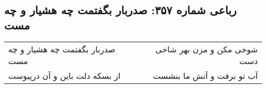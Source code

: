 \begin{center}
\section*{رباعی شماره ۳۵۷: صدربار بگفتمت چه هشیار و چه مست}
\label{sec:0357}
\begin{longtable}{l p{0.5cm} r}
صدربار بگفتمت چه هشیار و چه مست
&&
شوخی مکن و مزن بهر شاخی دست
\\
از بسکه دلت باین و آن درپیوست
&&
آب تو برفت و آتش ما بنشست
\\
\end{longtable}
\end{center}

